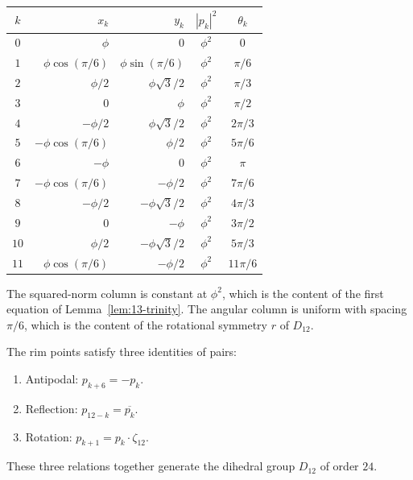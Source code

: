 \begin{center}
\begin{tabular}{c|rr|c|c}
$k$ & $x_{k}$ & $y_{k}$ & $|p_{k}|^{2}$ & $\theta_{k}$ \\\hline
$0$  & $\phi$              & $0$               & $\phi^{2}$ & $0$     \\
$1$  & $\phi \cos(\pi/6)$  & $\phi \sin(\pi/6)$ & $\phi^{2}$ & $\pi/6$ \\
$2$  & $\phi/2$            & $\phi\sqrt{3}/2$  & $\phi^{2}$ & $\pi/3$ \\
$3$  & $0$                 & $\phi$            & $\phi^{2}$ & $\pi/2$ \\
$4$  & $-\phi/2$           & $\phi\sqrt{3}/2$  & $\phi^{2}$ & $2\pi/3$\\
$5$  & $-\phi\cos(\pi/6)$  & $\phi/2$          & $\phi^{2}$ & $5\pi/6$\\
$6$  & $-\phi$             & $0$               & $\phi^{2}$ & $\pi$   \\
$7$  & $-\phi\cos(\pi/6)$  & $-\phi/2$         & $\phi^{2}$ & $7\pi/6$\\
$8$  & $-\phi/2$           & $-\phi\sqrt{3}/2$ & $\phi^{2}$ & $4\pi/3$\\
$9$  & $0$                 & $-\phi$           & $\phi^{2}$ & $3\pi/2$\\
$10$ & $\phi/2$            & $-\phi\sqrt{3}/2$ & $\phi^{2}$ & $5\pi/3$\\
$11$ & $\phi\cos(\pi/6)$   & $-\phi/2$         & $\phi^{2}$ & $11\pi/6$\\
\end{tabular}
\end{center}

The squared-norm column is constant at $\phi^{2}$, which is the
content of the first equation of Lemma~\ref{lem:13-trinity}. The
angular column is uniform with spacing $\pi/6$, which is the
content of the rotational symmetry $r$ of $D_{12}$.

The rim points satisfy three identities of pairs:

\begin{enumerate}
\item Antipodal: $p_{k+6} = -p_{k}$.
\item Reflection: $p_{12-k} = \overline{p_{k}}$.
\item Rotation: $p_{k+1} = p_{k} \cdot \zeta_{12}$.
\end{enumerate}

These three relations together generate the dihedral group $D_{12}$
of order $24$.

